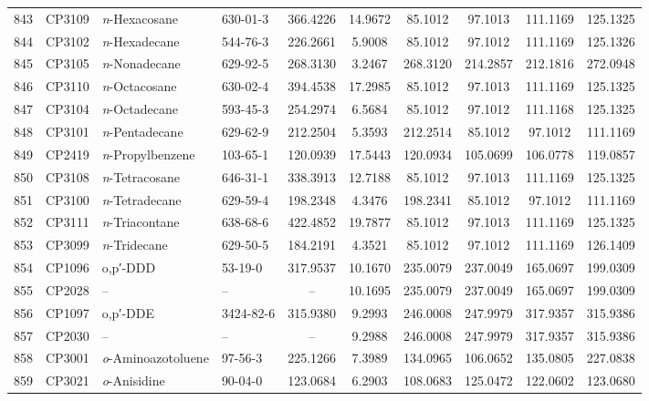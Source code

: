 \begin{longtable}{clllcccccc}
843 & CP3109 & \textit{n}-Hexacosane & 630-01-3 & 366.4226 & 14.9672 & 85.1012 & 97.1013 & 111.1169 & 125.1325 \\ 
844 & CP3102 & \textit{n}-Hexadecane & 544-76-3 & 226.2661 & 5.9008 & 85.1012 & 97.1012 & 111.1169 & 125.1326 \\ 
845 & CP3105 & \textit{n}-Nonadecane & 629-92-5 & 268.3130 & 3.2467 & 268.3120 & 214.2857 & 212.1816 & 272.0948 \\ 
846 & CP3110 & \textit{n}-Octacosane & 630-02-4 & 394.4538 & 17.2985 & 85.1012 & 97.1013 & 111.1169 & 125.1325 \\ 
847 & CP3104 & \textit{n}-Octadecane & 593-45-3 & 254.2974 & 6.5684 & 85.1012 & 97.1012 & 111.1168 & 125.1325 \\ 
848 & CP3101 & \textit{n}-Pentadecane & 629-62-9 & 212.2504 & 5.3593 & 212.2514 & 85.1012 & 97.1012 & 111.1169 \\ 
849 & CP2419 & \textit{n}-Propylbenzene & 103-65-1 & 120.0939 & 17.5443 & 120.0934 & 105.0699 & 106.0778 & 119.0857 \\ 
850 & CP3108 & \textit{n}-Tetracosane & 646-31-1 & 338.3913 & 12.7188 & 85.1012 & 97.1013 & 111.1169 & 125.1325 \\ 
851 & CP3100 & \textit{n}-Tetradecane & 629-59-4 & 198.2348 & 4.3476 & 198.2341 & 85.1012 & 97.1012 & 111.1169 \\ 
852 & CP3111 & \textit{n}-Triacontane & 638-68-6 & 422.4852 & 19.7877 & 85.1012 & 97.1013 & 111.1169 & 125.1325 \\ 
853 & CP3099 & \textit{n}-Tridecane & 629-50-5 & 184.2191 & 4.3521 & 85.1012 & 97.1012 & 111.1169 & 126.1409 \\ 
854 & CP1096 & o,p′-DDD & 53-19-0 & 317.9537 & 10.1670 & 235.0079 & 237.0049 & 165.0697 & 199.0309 \\ 
855 & CP2028 & – & – & – & 10.1695 & 235.0079 & 237.0049 & 165.0697 & 199.0309 \\ 
856 & CP1097 & o,p′-DDE & 3424-82-6 & 315.9380 & 9.2993 & 246.0008 & 247.9979 & 317.9357 & 315.9386 \\ 
857 & CP2030 & – & – & – & 9.2988 & 246.0008 & 247.9979 & 317.9357 & 315.9386 \\ 
858 & CP3001 & \textit{o}-Aminoazotoluene\smash{\textsuperscript{\textdaggerdbl}} & 97-56-3 & 225.1266 & 7.3989 & 134.0965 & 106.0652 & 135.0805 & 227.0838 \\ 
859 & CP3021 & \textit{o}-Anisidine\smash{\textsuperscript{\textdaggerdbl}} & 90-04-0 & 123.0684 & 6.2903 & 108.0683 & 125.0472 & 122.0602 & 123.0680 \\ 

\end{longtable}
